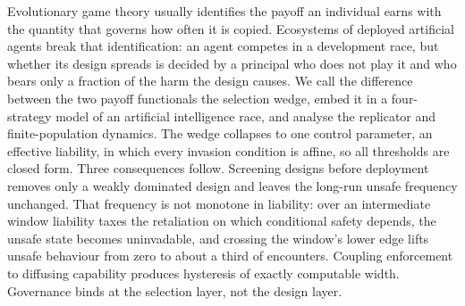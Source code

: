 
\noindent
Evolutionary game theory usually identifies the payoff an individual earns with
the quantity that governs how often it is copied. Ecosystems of deployed
artificial agents break that identification: an agent competes in a development
race, but whether its design spreads is decided by a principal who does not play
it and who bears only a fraction of the harm the design causes. We call the
difference between the two payoff functionals the selection wedge, embed it in a
four-strategy model of an artificial intelligence race, and analyse the
replicator and finite-population dynamics. The wedge collapses to one control
parameter, an effective liability, in which every invasion condition is affine,
so all thresholds are closed form. Three consequences follow. Screening designs
before deployment removes only a weakly dominated design and leaves the long-run
unsafe frequency unchanged. That frequency is not monotone in liability: over an
intermediate window liability taxes the retaliation on which conditional safety
depends, the unsafe state becomes uninvadable, and crossing the window's lower
edge lifts unsafe behaviour from zero to about a third of encounters. Coupling
enforcement to diffusing capability produces hysteresis of exactly computable
width. Governance binds at the selection layer, not the design layer.

